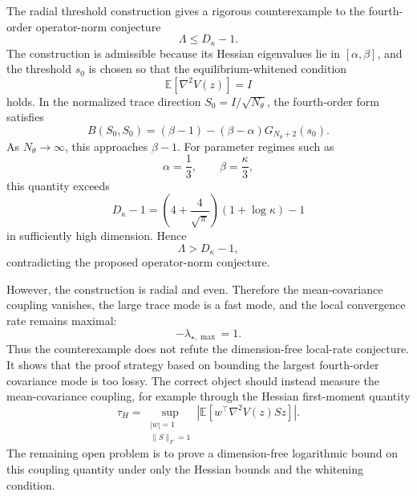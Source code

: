 \documentclass[11pt]{article}
\numberwithin{equation}{section}
\begin{document}
The radial threshold construction gives a rigorous counterexample to the fourth-order operator-norm conjecture
\begin{equation}
    \Lambda\le D_\kappa-1.
\end{equation}
The construction is admissible because its Hessian eigenvalues lie in $[\alpha,\beta]$, and the threshold $s_0$ is chosen so that the equilibrium-whitened condition
\begin{equation}
    \mathbb E[\nabla^2 V(z)]=I
\end{equation}
holds. 
In the normalized trace direction $S_0=I/\sqrt{N_\theta}$, the fourth-order form satisfies
\begin{equation}
    B(S_0,S_0)
    =
    (\beta-1)-(\beta-\alpha)G_{N_\theta+2}(s_0).
\end{equation}
As $N_\theta\to\infty$, this approaches $\beta-1$. 
For parameter regimes such as
\begin{equation}
    \alpha=\frac13,
    \qquad
    \beta=\frac{\kappa}{3},
\end{equation}
this quantity exceeds
\begin{equation}
    D_\kappa-1
    =
    \left(4+\frac{4}{\sqrt{\pi}}\right)(1+\log\kappa)-1
\end{equation}
in sufficiently high dimension. 
Hence
\begin{equation}
    \Lambda>D_\kappa-1,
\end{equation}
contradicting the proposed operator-norm conjecture.

However, the construction is radial and even. 
Therefore the mean-covariance coupling vanishes, the large trace mode is a fast mode, and the local convergence rate remains maximal:
\begin{equation}
    -\lambda_{\star,\max}=1.
\end{equation}
Thus the counterexample does not refute the dimension-free local-rate conjecture. 
It shows that the proof strategy based on bounding the largest fourth-order covariance mode is too lossy. 
The correct object should instead measure the mean-covariance coupling, for example through the Hessian first-moment quantity
\begin{equation}
    \tau_H
    =
    \sup_{\substack{|w|=1\\ \|S\|_F=1}}
    \left|
    \mathbb E[
    w^\top \nabla^2 V(z)Sz
    ]
    \right|.
\end{equation}
The remaining open problem is to prove a dimension-free logarithmic bound on this coupling quantity under only the Hessian bounds and the whitening condition.
\end{document}

